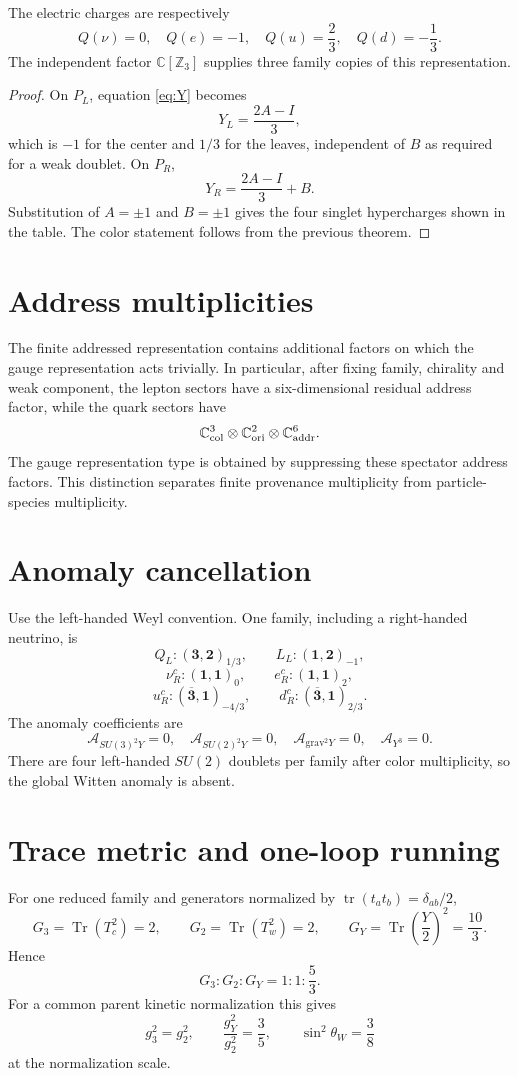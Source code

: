 \documentclass[11pt]{article}
\theoremstyle{definition}\newtheorem{definition}[theorem]{Definition}
\theoremstyle{remark}\newtheorem{remark}[theorem]{Remark}
\begin{document}
The electric charges are respectively
\[
Q(\nu)=0,\quad Q(e)=-1,\quad Q(u)=\frac23,\quad Q(d)=-\frac13.
\]
The independent factor $\mathbb C[\mathbb Z_3]$ supplies three family copies of this representation.

\begin{proof}
On $P_L$, equation \eqref{eq:Y} becomes
\[
Y_L=\frac{2A-I}{3},
\]
which is $-1$ for the center and $1/3$ for the leaves, independent of $B$ as required for a weak doublet.  On $P_R$,
\[
Y_R=\frac{2A-I}{3}+B.
\]
Substitution of $A=\pm1$ and $B=\pm1$ gives the four singlet hypercharges shown in the table.  The color statement follows from the previous theorem.
\end{proof}

\section{Address multiplicities}
The finite addressed representation contains additional factors on which the gauge representation acts trivially.  In particular, after fixing family, chirality and weak component, the lepton sectors have a six-dimensional residual address factor, while the quark sectors have
\[
\mathbb C^3_{\rm col}\otimes\mathbb C^2_{\rm ori}\otimes\mathbb C^6_{\rm addr}.
\]
The gauge representation type is obtained by suppressing these spectator address factors.  This distinction separates finite provenance multiplicity from particle-species multiplicity.

\section{Anomaly cancellation}
Use the left-handed Weyl convention.  One family, including a right-handed neutrino, is
\[
Q_L:(\mathbf3,\mathbf2)_{1/3},\qquad
L_L:(\mathbf1,\mathbf2)_{-1},
\]
\[
\nu_R^c:(\mathbf1,\mathbf1)_0,\qquad
e_R^c:(\mathbf1,\mathbf1)_2,
\]
\[
 u_R^c:(\overline{\mathbf3},\mathbf1)_{-4/3},\qquad
 d_R^c:(\overline{\mathbf3},\mathbf1)_{2/3}.
\]
The anomaly coefficients are
\[
\mathcal A_{SU(3)^2Y}=0,
\quad
\mathcal A_{SU(2)^2Y}=0,
\quad
\mathcal A_{\mathrm{grav}^2Y}=0,
\quad
\mathcal A_{Y^3}=0.
\]
There are four left-handed $SU(2)$ doublets per family after color multiplicity, so the global Witten anomaly is absent.

\section{Trace metric and one-loop running}
For one reduced family and generators normalized by $\operatorname{tr}(t_at_b)=\delta_{ab}/2$,
\[
G_3=\operatorname{Tr}(T_c^2)=2,
\qquad
G_2=\operatorname{Tr}(T_w^2)=2,
\qquad
G_Y=\operatorname{Tr}\left(\frac Y2\right)^2=\frac{10}{3}.
\]
Hence
\[
G_3:G_2:G_Y=1:1:\frac53.
\]
For a common parent kinetic normalization this gives
\[
g_3^2=g_2^2,
\qquad
\frac{g_Y^2}{g_2^2}=\frac35,
\qquad
\sin^2\theta_W=\frac38
\]
at the normalization scale.
\end{document}
